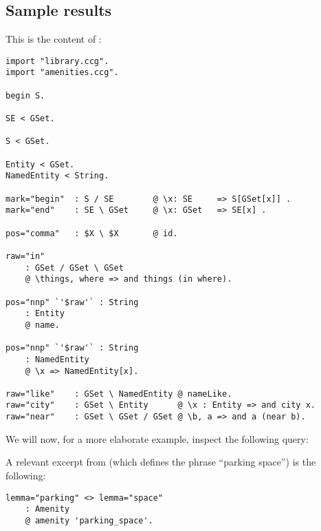 \documentclass[main.tex]{subfiles}
\begin{document}
\subsection{Sample results}
This is the content of :
\begin{lstwrap}\begin{lstlisting}
import "library.ccg".
import "amenities.ccg".

begin S.

SE < GSet.

S < GSet.

Entity < GSet.
NamedEntity < String.

mark="begin"  : S / SE        @ \x: SE     => S[GSet[x]] .
mark="end"    : SE \ GSet     @ \x: GSet   => SE[x] .

pos="comma"   : $X \ $X       @ id.

raw="in"      
    : GSet / GSet \ GSet 
    @ \things, where => and things (in where).

pos="nnp" `'$raw'` : String
    : Entity          
    @ name.

pos="nnp" `'$raw'` : String
    : NamedEntity       
    @ \x => NamedEntity[x].

raw="like"    : GSet \ NamedEntity @ nameLike.
raw="city"    : GSet \ Entity      @ \x : Entity => and city x.
raw="near"    : GSet \ GSet / GSet @ \b, a => and a (near b).
\end{lstlisting}\end{lstwrap}

We will now, for a more elaborate example, inspect the following query:
\begin{center}
\end{center}

A relevant excerpt from  (which defines the phrase
``parking space'') is the following:
\begin{lstwrap}\begin{lstlisting}
lemma="parking" <> lemma="space"
    : Amenity
    @ amenity 'parking_space'.
\end{lstlisting}\end{lstwrap}
\end{document}

